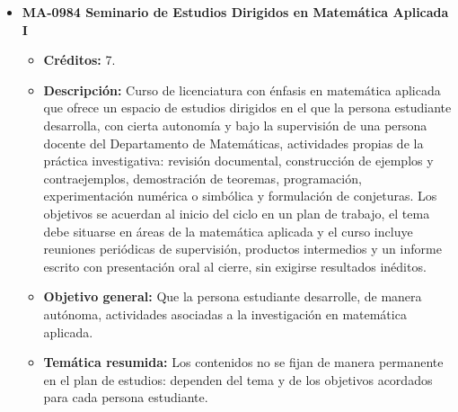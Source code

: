 \begin{itemize}[leftmargin=1.3em, itemsep=10pt, topsep=4pt, label={\color{Azul-UCR}$\blacksquare$}]
\item {\color{Azul-UCR}\textbf{MA-0984 Seminario de Estudios Dirigidos en Matemática Aplicada I}}\par\nopagebreak\smallskip
\begin{itemize}[leftmargin=1.1em, itemsep=3pt, topsep=2pt, parsep=2pt, label={\textendash}]
\item \textbf{Créditos:} 7.
\item \textbf{Descripción:} Curso de licenciatura con énfasis en matemática aplicada que ofrece un espacio de estudios dirigidos en el que la persona estudiante desarrolla, con cierta autonomía y bajo la supervisión de una persona docente del Departamento de Matemáticas, actividades propias de la práctica investigativa: revisión documental, construcción de ejemplos y contraejemplos, demostración de teoremas, programación, experimentación numérica o simbólica y formulación de conjeturas. Los objetivos se acuerdan al inicio del ciclo en un plan de trabajo, el tema debe situarse en áreas de la matemática aplicada y el curso incluye reuniones periódicas de supervisión, productos intermedios y un informe escrito con presentación oral al cierre, sin exigirse resultados inéditos.
\item \textbf{Objetivo general:} Que la persona estudiante desarrolle, de manera autónoma, actividades asociadas a la investigación en matemática aplicada.
\item \textbf{Temática resumida:} Los contenidos no se fijan de manera permanente en el plan de estudios: dependen del tema y de los objetivos acordados para cada persona estudiante.
\end{itemize}


\end{itemize}
